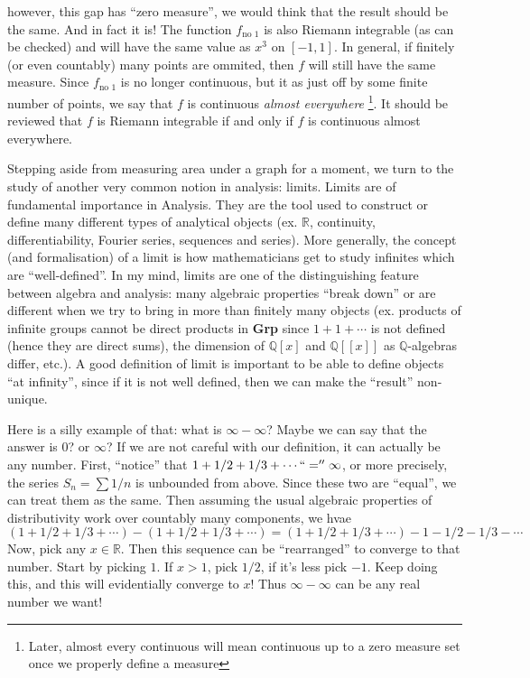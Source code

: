 \documentclass[oneside]{book}
\newcommand{\Q}{\mathbb{Q}}
\newcommand{\R}{\mathbb{R}}
\renewcommand{\bf}[1]{\textbf{#1}}
\begin{document}
however, this gap has ``zero measure'', we would think that the result should be the same. And in fact it is! The function
$f_{\text{no }1}$ is also Riemann integrable (as can be checked) and will have the same value as $x^3$ on $[-1,1]$. In
general, if finitely (or even countably) many points are ommited, then $f$ will still have the same measure. Since $f_{\text{no }1}$ is no
longer continuous, but it as just off by some finite number of points, we say that $f$ is continuous \emph{almost
everywhere} \footnote{Later, almost every continuous will mean continuous up to a zero measure set once we properly define
a measure}. It should be reviewed that $f$ is Riemann integrable if and only if $f$ is continuous almost everywhere. 

Stepping aside from measuring area under a graph for a moment, we turn to the study of another very common notion in
analysis: limits. Limits are of fundamental importance in Analysis. They are the tool used to construct or define many
different types of analytical objects (ex. $\R$, continuity, differentiability, Fourier series, sequences and series).
More generally, the concept (and formalisation) of a limit is how mathematicians get to study infinites which are
``well-defined''.
In my mind, limits are one of the distinguishing feature between algebra and analysis: many algebraic properties ``break
down''
or are different when we try to bring in more than finitely many objects (ex. products of infinite groups cannot be direct products in
\bf{Grp} since $1+1+\cdots$ is not defined (hence they are direct sums), the dimension of $\Q[x]$ and $\Q[[x]]$ as
$\Q$-algebras differ, etc.). A good definition of limit is important to be able to define objects ``at infinity'', since
if it is not well defined, then we can make the ``result'' non-unique. 

Here is a silly example of that: what is $\infty - \infty$? Maybe we can say that the answer is $0$? or $\infty$? If we are
not careful with our definition, it can actually be any number. First, ``notice'' that $1 + 1/2 + 1/3 + \cdots ``=''
\infty$, or more precisely, the series $S_{n} = \sum 1/n$ is unbounded from above. Since these two are ``equal'', we can
treat them as the same. Then assuming the usual algebraic
properties of distributivity work over countably many components, we hvae
\[
	(1 + 1/2 + 1/3 + \cdots) -  (1 + 1/2 + 1/3 + \cdots) = (1 + 1/2 + 1/3 + \cdots) - 1 - 1/2 - 1/3 - \cdots
\]
Now, pick any $ x \in \R$. Then this sequence can be ``rearranged'' to converge to that number. Start by picking $1$. If $x
> 1$, pick $1/2$, if it's less pick $-1$. Keep doing this, and this will evidentially converge to $x$! Thus $\infty
- \infty$ can be any real number we want!
\end{document}
